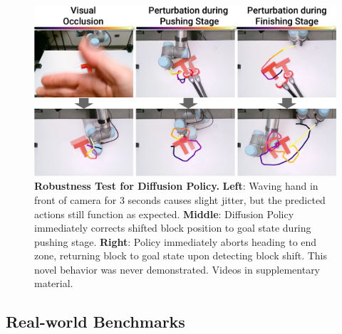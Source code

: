 \begin{figure}[t]
\centering
\includegraphics[width=\linewidth]{figure/real_robustness.pdf}

\caption{\textbf{Robustness Test for Diffusion Policy.} 
\label{fig:robustness}
\textbf{Left}: Waving hand in front of camera for 3 seconds causes slight jitter, but the predicted actions still function as expected. 
\textbf{Middle}: Diffusion Policy immediately corrects shifted block position to goal state during pushing stage.
\textbf{Right}: Policy immediately aborts heading to end zone, returning block to goal state upon detecting block shift. This novel behavior was never demonstrated.
Videos in supplementary material.}
\vspace{-2mm}
\end{figure}

\subsection{Real-world Benchmarks}

